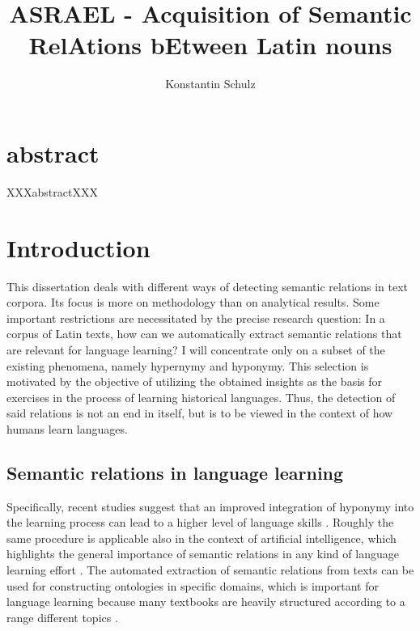 \documentclass[oneside]{book}
\begin{document}
\frontmatter
\title{ASRAEL - Acquisition of Semantic RelAtions bEtween Latin nouns}
\author{Konstantin Schulz}
\maketitle
\tableofcontents
\listoffigures
\listoftables
\printglossaries

\chapter*{abstract}
XXXabstractXXX
\mainmatter
\chapter{Introduction}
This dissertation deals with different ways of detecting semantic relations in text corpora. Its focus is more on methodology than on analytical results. Some important restrictions are necessitated by the precise research question: In a corpus of Latin texts, how can we automatically extract semantic relations that are relevant for language learning? I will concentrate only on a subset of the existing phenomena, namely hypernymy and hyponymy. This selection is motivated by the objective of utilizing the obtained insights as the basis for exercises in the process of learning historical languages. Thus, the detection of said relations is not an end in itself, but is to be viewed in the context of how humans learn languages. 

\section{Semantic relations in language learning}
Specifically, recent studies suggest that an improved integration of hyponymy into the learning process can lead to a higher level of language skills \parencite[196]{taslimExperimentalStudyTeaching2014}. Roughly the same procedure is applicable also in the context of artificial intelligence, which highlights the general importance of semantic relations in any kind of language learning effort \parencite[1306]{carlsonArchitectureNeverendingLanguage2010}. The automated extraction of semantic relations from texts can be used for constructing ontologies in specific domains, which is important for language learning because many textbooks are heavily structured according to a range different topics \parencite[192f.]{punuruLearningNontaxonomicalSemantic2012}. 
\end{document}
